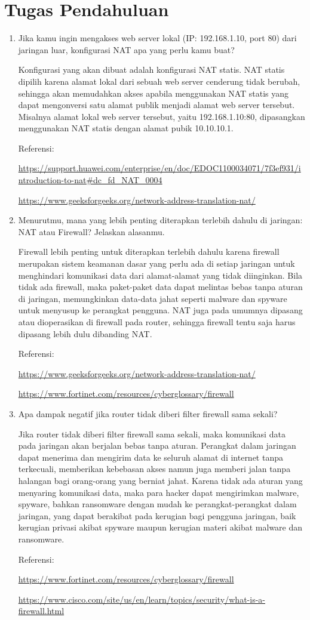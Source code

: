 \section{Tugas Pendahuluan}
\begin{enumerate}
	\item Jika kamu ingin mengakses web server lokal (IP: 192.168.1.10, port 80) dari jaringan luar, konfigurasi NAT apa yang perlu kamu buat?
	
	Konfigurasi yang akan dibuat adalah konfigurasi NAT statis. NAT statis dipilih karena alamat lokal dari sebuah web server cenderung tidak berubah, sehingga akan memudahkan akses apabila menggunakan NAT statis yang dapat mengonversi satu alamat publik menjadi alamat web server tersebut. Misalnya alamat lokal web server tersebut, yaitu 192.168.1.10:80, dipasangkan menggunakan NAT statis dengan alamat pubik 10.10.10.1.
	
	Referensi: 
	
	\url{https://support.huawei.com/enterprise/en/doc/EDOC1100034071/7f3ef931/introduction-to-nat#dc_fd_NAT_0004}
	
	\url{https://www.geeksforgeeks.org/network-address-translation-nat/}
	
	\item Menurutmu, mana yang lebih penting diterapkan terlebih dahulu di jaringan: NAT atau Firewall? Jelaskan alasanmu.
	
	Firewall lebih penting untuk diterapkan terlebih dahulu karena firewall merupakan sistem keamanan dasar yang perlu ada di setiap jaringan untuk menghindari komunikasi data dari alamat-alamat yang tidak diinginkan. Bila tidak ada firewall, maka paket-paket data dapat melintas bebas tanpa aturan di jaringan, memungkinkan data-data jahat seperti malware dan spyware untuk menyusup ke perangkat pengguna. NAT juga pada umumnya dipasang atau dioperasikan di firewall pada router, sehingga firewall tentu saja harus dipasang lebih dulu dibanding NAT.
	
	Referensi:
	
	\url{https://www.geeksforgeeks.org/network-address-translation-nat/}
	
	\url{https://www.fortinet.com/resources/cyberglossary/firewall}
	
	\item Apa dampak negatif jika router tidak diberi filter firewall sama sekali?
	
	Jika router tidak diberi filter firewall sama sekali, maka komunikasi data pada jaringan akan berjalan bebas tanpa aturan. Perangkat dalam jaringan dapat menerima dan mengirim data ke seluruh alamat di internet tanpa terkecuali, memberikan kebebasan akses namun juga memberi jalan tanpa halangan bagi orang-orang yang berniat jahat. Karena tidak ada aturan yang menyaring komunikasi data, maka para hacker dapat mengirimkan malware, spyware, bahkan ransomware dengan mudah ke perangkat-perangkat dalam jaringan, yang dapat berakibat pada kerugian bagi pengguna jaringan, baik kerugian privasi akibat spyware maupun kerugian materi akibat malware dan ransomware.
	
	Referensi:
	
	\url{https://www.fortinet.com/resources/cyberglossary/firewall}
	
	\url{https://www.cisco.com/site/us/en/learn/topics/security/what-is-a-firewall.html}
\end{enumerate}